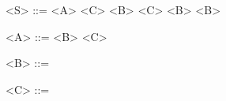 \begin{grammarEx}
	<S> ::= <A> <C> <B>
	  <B>
	 
	
	<A> ::=  
	 <C>
	
	<B> ::= 
	\alt \textepsilon{}
	
	<C> ::= 
	\alt \textepsilon{}
\end{grammarEx}